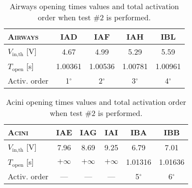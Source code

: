 \begin{table}[H]\centering
  {\renewcommand{\arraystretch}{1.2}
  \begin{tabularx}{\textwidth}{|P{6em}|C|C|C|C|}
    \hline
    \textsc{Airways}
    & IAD
    & IAF
    & IAH
    & IBL\\
    \hline
    $V_{\text{in,th}}$ [V]
    & 4.67
    & 4.99
    & 5.29
    & 5.59\\
    \hline
    $T_{\text{open}}$ [s]
    & 1.00361
    & 1.00536
    & 1.00781
    & 1.00961\\
    \hline
    Activ. order
    & 1$^{\circ}$
    & 2$^{\circ}$
    & 3$^{\circ}$
    & 4$^{\circ}$\\
    \hline
  \end{tabularx}
}
\caption{Airways opening times values and total activation order when
  test \#2 is performed.}
\label{tab:airways_test2}
\end{table}

\begin{table}[H]\centering
  {\renewcommand{\arraystretch}{1.2}
    \begin{tabularx}{\textwidth}{|P{6em}|C|C|C|C|C|}
      \hline
      \textsc{Acini}
      & IAE
      & IAG
      & IAI
      & IBA
      & IBB\\
      \hline
      $V_{\text{in,th}}$ [V]
      & 7.96
      & 8.69
      & 9.25
      & 6.79
      & 7.01\\
      \hline
      $T_{\text{open}}$ [s]
      & $+\infty$
      & $+\infty$
      & $+\infty$
      & 1.01316
      & 1.01636\\
      \hline
      Activ. order
      & ---
      & ---
      & ---
      & 5$^{\circ}$
      & 6$^{\circ}$\\
      \hline
    \end{tabularx}
    \caption{Acini opening times values and total activation order
      when test \#2 is performed.}
    \label{tab:acini_test2}
  }
\end{table}

